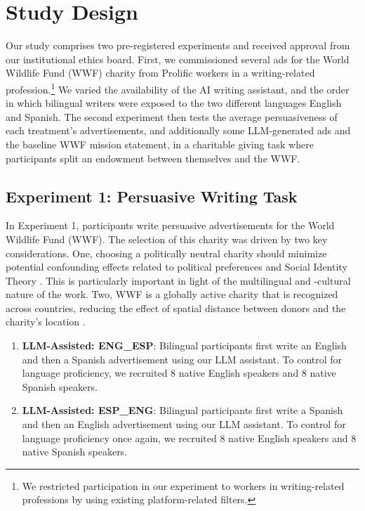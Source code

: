 \section{Study Design}
Our study comprises two pre-registered experiments and received approval from our institutional ethics board. First, we commissioned several ads for the World Wildlife Fund (WWF) charity from Prolific workers in a writing-related profession.\footnote{We restricted participation in our experiment to workers in writing-related professions by using existing platform-related filters.} We varied the availability of the AI writing assistant, and the order in which bilingual writers were exposed to the two different languages English and Spanish. The second experiment then tests the average persuasiveness of each treatment's advertisements, and additionally some LLM-generated ads and the baseline WWF mission statement, in a charitable giving task where participants split an endowment between themselves and the WWF.


\subsection{Experiment 1: Persuasive Writing Task}
 In Experiment 1, participants write persuasive advertisements for the World Wildlife Fund (WWF). The selection of this charity was driven by two key considerations. One, choosing a politically neutral charity should minimize potential confounding effects related to political preferences and Social Identity Theory \cite{ashmore2004organizing}. This is particularly important in light of the multilingual and -cultural nature of the work. Two, WWF is a globally active charity that is recognized across countries, reducing the effect of spatial distance between donors and the charity's location \cite{trope2010construal,Zhang2024-sv}. 


\begin{enumerate}
    \item \textbf{LLM-Assisted: ENG\_ESP}: Bilingual participants first write an English and then a Spanish advertisement using our LLM assistant. To control for language proficiency, we recruited 8 native English speakers and 8 native Spanish speakers.     
    \item \textbf{LLM-Assisted: ESP\_ENG}: Bilingual participants first write a Spanish and then an English advertisement using our LLM assistant. To control for language proficiency once again, we recruited 8 native English speakers and 8 native Spanish speakers.
\end{enumerate}

